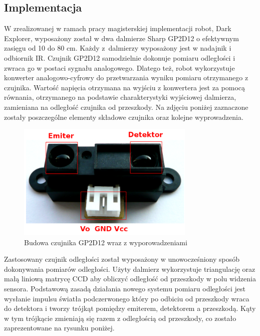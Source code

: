 \subsection{Implementacja}
W zrealizowanej w ramach pracy magisterskiej implementacji robot, Dark Explorer,
wyposażony został w dwa dalmierze Sharp GP2D12 o efektywnym zasięgu od 10 do 80
cm. Każdy z~dalmierzy wyposażony jest w nadajnik i odbiornik IR. Czujnik
GP2D12 samodzielnie dokonuje pomiaru odległości i zwraca go w postaci sygnału
analogowego. Dlatego też, robot wykorzystuje konwerter analogowo-cyfrowy do
przetwarzania wyniku pomiaru otrzymanego z czujnika. Wartość napięcia otrzymana
na wyjściu z konwertera jest za pomocą równania, otrzymanego na podstawie
charakterystyki wyjściowej dalmierza, zamieniana na odległość czujnika od
przeszkody. Na zdjęciu poniżej zaznaczone zostały poszczególne elementy składowe
czujnika oraz kolejne wyprowadzenia.

\begin{figure}[hb]
 \centering
 \includegraphics[width=85mm]{../images/ch04/real_gp2d12_view.png}
 \caption{Budowa czujnika GP2D12 wraz z wyporowadzeniami}
 \label{fig:SharpGP2D12}
\end{figure}

Zastosowany czujnik odległości został wyposażony w unowocześniony sposób
dokonywania pomiarów odległości. Użyty dalmierz wykorzystuje triangulację oraz
małą liniową matrycę CCD aby obliczyć odległość od przeszkody w polu
widzenia sensora\cite{website:acroname-robotics}. Podstawową zasadą działania
nowego systemu pomiaru odległości jest wysłanie impulsu światła podczerwonego który po odbiciu od przeszkody wraca
do detektora i tworzy trójkąt pomiędzy emiterem, detektorem a przeszkodą. Kąty w
tym trójkącie zmieniają się razem z odległością od przeszkody, co zostało
zaprezentowane na rysunku poniżej.

